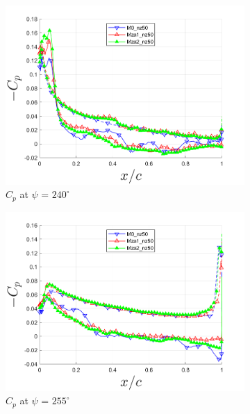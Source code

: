 \begin{figure}[H]
	\begin{subfigure}[b]{0.475\textwidth}
		\centering
		\includegraphics[width=1\textwidth]{figures/zonal_adapt_results/Cp_Re200k/Cp_ph_240.png}
		\caption{ $C_p$ at $\psi$ = $240^\circ$}
		\label{fig:zonal_Cp_Re200k_240}
	\end{subfigure}
	\begin{subfigure}[b]{0.475\textwidth}
	\centering
	\includegraphics[width=1\textwidth]{figures/zonal_adapt_results/Cp_Re200k/Cp_ph_255.png}
	\caption{ $C_p$ at $\psi$ = $255^\circ$}
	\label{fig:zonal_Cp_Re200k_255}
\end{subfigure}
	\begin{subfigure}[b]{0.475\textwidth}
		\centering

\end{subfigure}
\end{figure}
